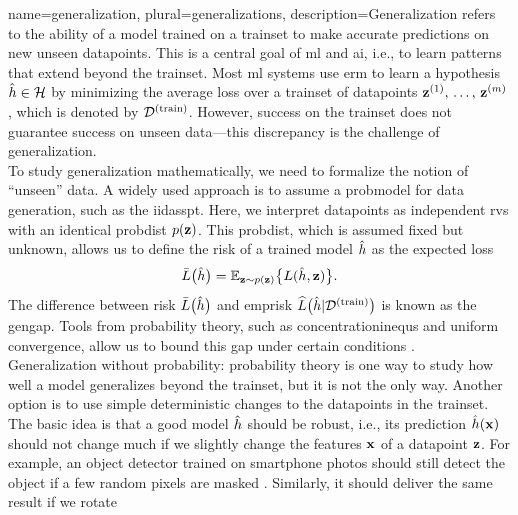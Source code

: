 {name={generalization}, plural={generalizations}, 
	description={Generalization refers to the ability of a \gls{model} trained on a \gls{trainset} to make accurate 
		\glspl{prediction} on new unseen \glspl{datapoint}. This is a central goal of \gls{ml} and \gls{ai}, i.e., 
		to learn patterns that extend beyond the \gls{trainset}. Most \gls{ml} systems 
		use \gls{erm} to learn a \gls{hypothesis} $\hat{h} \in \mathcal{H}$ by minimizing 
		the average \gls{loss} over a \gls{trainset} of \glspl{datapoint} ${\bf z}^{(1)}, \,\ldots, \,{\bf z}^{(m)}$, 
		which is denoted by $\mathcal{D}^{(\rm train)}$. However, success on the \gls{trainset} does not guarantee success on 
		unseen \gls{data}—this discrepancy is the challenge of generalization. \\ To study generalization 
		mathematically, we need to formalize the notion of ``unseen'' \gls{data}. A widely used 
		approach is to assume a \gls{probmodel} for \gls{data} generation, such as the \gls{iidasspt}. 
		Here, we interpret \glspl{datapoint} as independent \glspl{rv} with an identical 
		\gls{probdist} $p({\bf z})$. This \gls{probdist}, which is assumed fixed but unknown, 
		allows us to define the \gls{risk} of a trained \gls{model} $\hat{h}$ as the expected \gls{loss}
		\[
		\bar{L} \big( \hat{h} \big)=\mathbb{E}_{{\bf z} \sim p({\bf z})} \big\{ L(\hat{h}, {\bf z}) \big\}.
		\]
		The difference between \gls{risk} $\bar{L} \big( \hat{h} \big)$ and \gls{emprisk} $\widehat{L}\big(\hat{h}|\mathcal{D}^{(\rm train)}\big)$ 
		is known as the \gls{gengap}. Tools from \gls{probability} theory, such as \glspl{concentrationinequ} 
		and uniform \gls{convergence}, allow us to bound this gap under certain conditions \cite{ShalevMLBook}.\\
		Generalization without \gls{probability}: \Gls{probability} theory is one way to study how well a 
		\gls{model} generalizes beyond the \gls{trainset}, but it is not the only way. Another option is to use 
		simple deterministic changes to the \glspl{datapoint} in the \gls{trainset}. The basic idea is that a 
		good \gls{model} $\hat{h}$ should be robust, i.e., its \gls{prediction} $\hat{h}({\bf x})$ 
		should not change much if we slightly change the \glspl{feature} ${\bf x}$ of a \gls{datapoint} ${\bf z}$. 
		For example, an object detector trained on smartphone photos should still detect the object if a few 
		random pixels are masked \cite{OnePixelAttack}. Similarly, it should deliver the same result if we rotate 
}}

